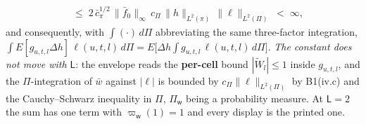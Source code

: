 \begin{lemma}
\begin{equation}
\begin{split}
&\;\le\;2\,\bar c_\pi^{1/2}\,\|\bar f_0\|_\infty\,c_\Pi\,\|h\|_{L^{2}(\pi)}\,\|\ell\|_{L^{2}(\Pi)}
\;<\;\infty,
\end{split}
\end{equation}
and consequently, with $\int(\cdot)\,d\Pi$ abbreviating the same three-factor integration,
$\int E[g_{u,t,l}\Delta h]\,\ell(u,t,l)\,d\Pi
=E\big[\Delta h\int g_{u,t,l}\,\ell(u,t,l)\,d\Pi\big]$.
\emph{The constant does not move with $\mathsf L$}: the envelope reads the \textbf{per-cell} bound
$|\widetilde W_l|\le1$ inside $g_{u,t,l}$, and the $\Pi$-integration of $\bar w$ against $|\ell|$ is
bounded by $c_\Pi\|\ell\|_{L^{2}(\Pi)}$ by B1(iv.c) and the Cauchy--Schwarz inequality in $\Pi$,
$\Pi_{\mathsf w}$ being a probability measure. At $\mathsf L=2$ the sum has one term with
$\varpi_{\mathsf w}(1)=1$ and every display is the printed one.
\end{lemma}

